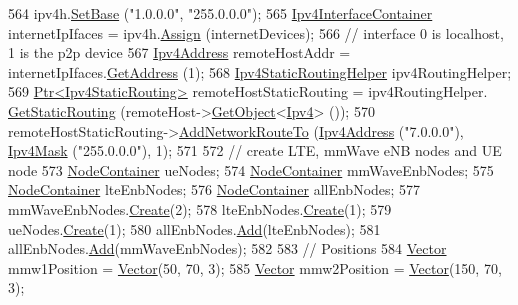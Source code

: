 \begin{DoxyCode}
{564   ipv4h.\hyperlink{classns3_1_1Ipv4AddressHelper_acf7b16dd25bac67e00f5e25f90a9a035}{SetBase} (\textcolor{stringliteral}{"1.0.0.0"}, \textcolor{stringliteral}{"255.0.0.0"});
565   \hyperlink{classns3_1_1Ipv4InterfaceContainer}{Ipv4InterfaceContainer} internetIpIfaces = ipv4h.\hyperlink{classns3_1_1Ipv4AddressHelper_af8e7f4a1a7e74c00014a1eac445a27af}{Assign} (internetDevices);
566   \textcolor{comment}{// interface 0 is localhost, 1 is the p2p device}
567   \hyperlink{classns3_1_1Ipv4Address}{Ipv4Address} remoteHostAddr = internetIpIfaces.\hyperlink{classns3_1_1Ipv4InterfaceContainer_ae63208dcd222be986822937ee4aa828c}{GetAddress} (1);
568   \hyperlink{classns3_1_1Ipv4StaticRoutingHelper}{Ipv4StaticRoutingHelper} ipv4RoutingHelper;
569   \hyperlink{classns3_1_1Ptr}{Ptr<Ipv4StaticRouting>} remoteHostStaticRouting = ipv4RoutingHelper.
      \hyperlink{classns3_1_1Ipv4StaticRoutingHelper_a731206e50d305695dac7fb2ef963a4bb}{GetStaticRouting} (remoteHost->\hyperlink{classns3_1_1Object_a13e18c00017096c8381eb651d5bd0783}{GetObject}<\hyperlink{classns3_1_1Ipv4}{Ipv4}> ());
570   remoteHostStaticRouting->\hyperlink{classns3_1_1Ipv4StaticRouting_a8bf5eaa7ba49fe33c78c70d5560b6c39}{AddNetworkRouteTo} (\hyperlink{classns3_1_1Ipv4Address}{Ipv4Address} (\textcolor{stringliteral}{"7.0.0.0"}), 
      \hyperlink{classns3_1_1Ipv4Mask}{Ipv4Mask} (\textcolor{stringliteral}{"255.0.0.0"}), 1);
571 
572   \textcolor{comment}{// create LTE, mmWave eNB nodes and UE node}
573   \hyperlink{classns3_1_1NodeContainer}{NodeContainer} ueNodes;
574   \hyperlink{classns3_1_1NodeContainer}{NodeContainer} mmWaveEnbNodes;
575   \hyperlink{classns3_1_1NodeContainer}{NodeContainer} lteEnbNodes;
576   \hyperlink{classns3_1_1NodeContainer}{NodeContainer} allEnbNodes;
577   mmWaveEnbNodes.\hyperlink{classns3_1_1NodeContainer_a787f059e2813e8b951cc6914d11dfe69}{Create}(2);
578   lteEnbNodes.\hyperlink{classns3_1_1NodeContainer_a787f059e2813e8b951cc6914d11dfe69}{Create}(1);
579   ueNodes.\hyperlink{classns3_1_1NodeContainer_a787f059e2813e8b951cc6914d11dfe69}{Create}(1);
580   allEnbNodes.\hyperlink{classns3_1_1NodeContainer_aa60b3a0e70f2fb324e16ffcf8bf31fcb}{Add}(lteEnbNodes);
581   allEnbNodes.\hyperlink{classns3_1_1NodeContainer_aa60b3a0e70f2fb324e16ffcf8bf31fcb}{Add}(mmWaveEnbNodes);
582 
583   \textcolor{comment}{// Positions}
584   \hyperlink{classns3_1_1Vector3D_a7e59b47bc94c9cb1dadff68c1d0112d8}{Vector} mmw1Position = \hyperlink{classns3_1_1Vector3D_a7e59b47bc94c9cb1dadff68c1d0112d8}{Vector}(50, 70, 3);
585   \hyperlink{classns3_1_1Vector3D_a7e59b47bc94c9cb1dadff68c1d0112d8}{Vector} mmw2Position = \hyperlink{classns3_1_1Vector3D_a7e59b47bc94c9cb1dadff68c1d0112d8}{Vector}(150, 70, 3);
}
\end{DoxyCode}
